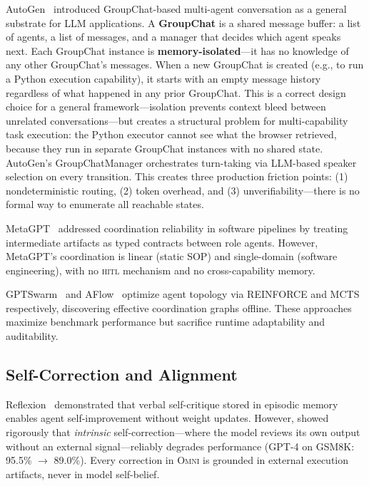 \documentclass[11pt,a4paper]{article}
\newcommand{\omni}{\textsc{Omni}}
\newcommand{\hitl}{\textsc{hitl}}
\begin{document}
AutoGen~\cite{wu2024autogen} introduced GroupChat-based multi-agent conversation as a general substrate for LLM applications. A \textbf{GroupChat} is a shared message buffer: a list of agents, a list of messages, and a manager that decides which agent speaks next. Each GroupChat instance is \textbf{memory-isolated}---it has no knowledge of any other GroupChat's messages. When a new GroupChat is created (e.g., to run a Python execution capability), it starts with an empty message history regardless of what happened in any prior GroupChat. This is a correct design choice for a general framework---isolation prevents context bleed between unrelated conversations---but creates a structural problem for multi-capability task execution: the Python executor cannot see what the browser retrieved, because they run in separate GroupChat instances with no shared state. AutoGen's GroupChatManager orchestrates turn-taking via LLM-based speaker selection on every transition. This creates three production friction points: (1) nondeterministic routing, (2) token overhead, and (3) unverifiability---there is no formal way to enumerate all reachable states.

MetaGPT~\cite{hong2024metagpt} addressed coordination reliability in software pipelines by treating intermediate artifacts as typed contracts between role agents. However, MetaGPT's coordination is linear (static SOP) and single-domain (software engineering), with no \hitl{} mechanism and no cross-capability memory.

GPTSwarm~\cite{besta2024gptswarm} and AFlow~\cite{zhao2025aflow} optimize agent topology via REINFORCE and MCTS respectively, discovering effective coordination graphs offline. These approaches maximize benchmark performance but sacrifice runtime adaptability and auditability.

\subsection{Self-Correction and Alignment}

Reflexion~\cite{shinn2023reflexion} demonstrated that verbal self-critique stored in episodic memory enables agent self-improvement without weight updates. However, \citet{huang2024llms} showed rigorously that \emph{intrinsic} self-correction---where the model reviews its own output without an external signal---reliably degrades performance (GPT-4 on GSM8K: 95.5\% $\to$ 89.0\%). Every correction in \omni{} is grounded in external execution artifacts, never in model self-belief.
\end{document}
